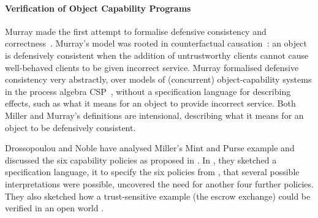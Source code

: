 \paragraph{Verification of Object Capability Programs}
Murray made the first attempt to formalise defensive consistency and
correctness~\cite{Murray10dphil}.  Murray's model was rooted in
counterfactual causation~\cite{Lewis_73}: an object is defensively
consistent when the addition of untrustworthy clients cannot cause
well-behaved clients to be given incorrect service.  Murray formalised
defensive consistency very abstractly, over models of (concurrent)
object-capability systems in the process algebra CSP~\cite{Hoare:CSP},
without a specification language for describing effects, such as what
it means for an object to provide incorrect service.  Both Miller and
Murray's definitions are intensional, describing what it means for an
object to be defensively consistent.


Dro\-sso\-pou\-lou and Noble \cite{capeFTfJP,capeFTfJP14} have
analysed Miller's Mint and Purse example \cite{MillerPhD} 
and discussed the six
capability policies 
as proposed in \cite{MillerPhD}.
In %
\cite{WAS-OOPSLA14-TR}, {they} %
sketched a  specification language,    it to  
specify the six policies from \cite{MillerPhD}, %
 that several possible interpretations were possible, %
 uncovered
the need for another four further policies.
They also
  sketched how 
a trust-sensitive 
example (the escrow exchange) could be verified in an open world
\cite{swapsies}. 
 
